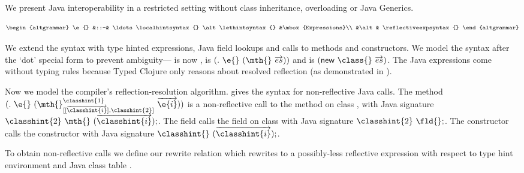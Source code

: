 We present Java interoperability in a restricted setting without class inheritance,
overloading or Java Generics.

  $$
  \begin{altgrammar}
    \e{} &::=& \ldots   \localhintsyntax{} \alt \lethintsyntax{} &\mbox{Expressions}\\
            &\alt& \reflectiveexpsyntax{} 
  \end{altgrammar}
  $$

We extend the syntax with type hinted expressions, Java field lookups and calls to
methods and constructors. We model the syntax after the `dot' special
form to prevent ambiguity--- is now \fieldexp{\fld{}}{\e{}},
 is $\methodexp{\mth{}}{\e{}}{\overrightarrow{es}}$
and  is $\newexp{\class{}}{\overrightarrow{es}}$.
The Java expressions come without typing rules because Typed Clojure
only reasons about resolved reflection
(as demonstrated in ).

Now we model the compiler's reflection-resolution algorithm.
 gives the syntax for non-reflective Java calls.
The method ${\methodstaticexp {\classhint{1}}
                             {\overrightarrow {\classhint{i}}}
                             {\classhint{2}}
                             {\mth{}} {\e{}} {\overrightarrow{\e{i}}}}$
is a non-reflective call to the \mth{} method on class {}, 
with Java signature 
${\classhint{2}}\ \mth{}\ (\overrightarrow {\classhint{i}});$.
The field { {} {\fld{}} {\e{}}}
calls the field on class {} with Java signature
${\classhint{2}}\ \fld{};$.
The constructor { {\classhint{}} 
                               {\class{}} {}}
calls the constructor with Java signature
${\classhint{}}\ ({\overrightarrow{\classhint{i}}});$.

%


To obtain non-reflective calls we define our rewrite relation
\rewrite {\taenv{}} {\e{}} {\ep{}}
which rewrites \e{} to a possibly-less reflective expression
\ep{} with respect to type hint environment
\taenv{} and Java class table \ct{}.

